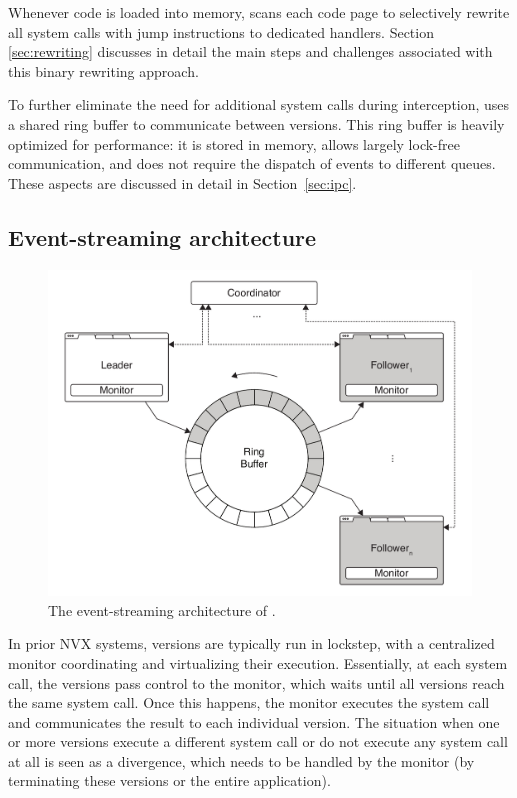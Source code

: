 Whenever code is loaded into memory, \nx scans each code page to
selectively rewrite all system calls with jump instructions to dedicated
handlers.  Section \ref{sec:rewriting} discusses in detail the main
steps and challenges associated with this binary rewriting approach.

To further eliminate the need for additional system calls during interception,
\nx uses a shared ring buffer to communicate between versions.  This
ring buffer is heavily optimized for performance: it is stored in
memory, allows largely lock-free communication, and does not require
the dispatch of events to different queues.  These aspects are
discussed in detail in Section~\ref{sec:ipc}.



\subsection{Event-streaming architecture}
\label{sec:coordination}

\begin{figure}[t]
  \begin{center}
    \includegraphics[width=\columnwidth]{efficient-execution/figures/architecture}
    \caption{The event-streaming architecture of \nx.}
    \label{fig:architecture}
  \end{center}
\end{figure}


In prior NVX systems, versions are typically run in lockstep, with a centralized
monitor coordinating and virtualizing their execution.  Essentially, at each
system call, the versions pass control to the monitor, which waits until all
versions reach the same system call.  Once this happens, the monitor executes
the system call and communicates the result to each individual version. The
situation when one or more versions execute a different system call or do not
execute any system call at all is seen as a divergence, which needs to be
handled by the monitor (\eg by terminating these versions or the entire
application).


